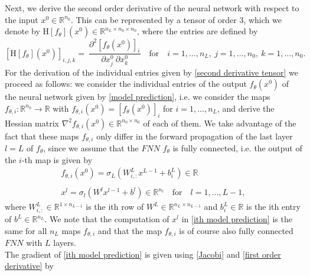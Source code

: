 Next, we derive the second order derivative of the neural network with respect to the input $x^0 \in \mathbb{R}^{n_0}$. This can be represented by a tensor of order $3$, which we denote by $\mathrm{H} \left[f_{\theta} \right]\left(x^0\right) \in \mathbb{R}^{n_L \times n_0 \times n_0}$, where the entries are defined by
\begin{equation}
    \label{second derivative tensor}
    \left[ \mathrm{H} \left[f_{\theta} \right]\left(x^0\right) \right]_{i,j,k} =\ \frac{\partial^2 \left[f_{\theta}\left(x^0\right)\right]_i}{\partial x^0_{j} \ \partial x^0_{k}} \quad \text{for} \quad i = 1,\ldots, n_L, \ j = 1,\ldots, n_0, \ k = 1,\ldots, n_0.
\end{equation}
For the derivation of the individual entries given by \cref{second derivative tensor} we proceed as follows: we consider the individual entries of the output $f_{\theta}\left(x^0\right)$ of the neural network given by \cref{model prediction}, i.e. we consider the maps $f_{\theta, i} \colon \mathbb{R}^{n_0} \to \mathbb{R}$ with $f_{\theta, i} \left( x^0 \right) = \left[ f_{\theta} (x^0) \right]_i$ for $i = 1, \ldots, n_L$, and derive the Hessian matrix $\nabla^2 f_{\theta, i} \left( x^0 \right) \in \mathbb{R}^{n_0 \times n_0}$ of each of them. We take advantage of the fact that these maps $f_{\theta, i}$ only differ in the forward propagation of the last layer $l = L$ of $f_{\theta}$, since we assume that the $FNN$ $f_{\theta}$ is fully connected, i.e. the output of the $i$-th map is given by 
\begin{equation} 
    \label{ith model prediction}
    \begin{gathered}
        f_{\theta, i} (x^0) = \sigma_L\left(W^L_{i,:} x^{L-1}  + b^{L}_{i} \right) \in \mathbb{R} \\
        \\
        x^l = \sigma_l\left(W^l x^{l-1} + b^l\right) \in \mathbb{R}^{n_l} \quad \text{for} \quad l = 1, \ldots, L-1,
    \end{gathered} 
\end{equation} 
where $W^L_{i,:} \in \mathbb{R}^{1 \times n_{L-1}}$ is the ith row of $W^L \in \mathbb{R}^{n_L \times n_{L-1}}$ and $b^{L}_{i} \in \mathbb{R}$ is the ith entry of $b^{L} \in \mathbb{R}^{n_L}$. We note that the computation of $x^l$ in \cref{ith model prediction} is the same for all $n_L$ maps $f_{\theta, i}$ and that the map $f_{\theta, i}$ is of course also fully connected $FNN$ with $L$ layers. \\
The gradient of \cref{ith model prediction} is given using \cref{Jacobi} and \cref{first order derivative} by
